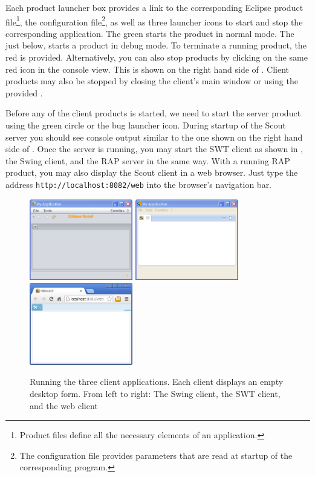 \documentclass[a4paper,10pt,twoside]{book}
\begin{document}
Each product launcher box provides a link to the corresponding Eclipse product file\footnote{
Product files define all the necessary elements of an application.
},
the configuration file\footnote{
The configuration file  provides parameters that are read at startup of the corresponding program.
},
as well as three launcher icons to start and stop the corresponding application.
The green  starts the product in normal mode.
The  just below, starts a product in debug mode.
To terminate a running product, the red  is provided. 
Alternatively, you can also stop products by clicking on the same red icon in the console view.
This is shown on the right hand side of .
Client products may also be stopped by closing the client's main window or using the provided .

Before any of the client products is started, we need to start the server product using the green circle or the bug launcher icon.
During startup of the Scout server you should see console output similar to the one shown on the right hand side of .
Once the server is running, you may start the SWT client as shown in , the Swing client, and the RAP server in the same way.
With a running RAP product, you may also display the Scout client in a web browser.
Just type the address \texttt{http://localhost:8082/web} into the browser's navigation bar.

\begin{figure}
\includegraphics[width=4.5cm]{hellworld_empty_swing.png} \hspace{3mm}
\includegraphics[width=4.5cm]{hellworld_empty_swt.png} \hspace{3mm}
\includegraphics[width=4.5cm]{hellworld_empty_rap.png}
\caption{Running the three client applications. 
Each client displays an empty desktop form. 
From left to right: The Swing client, the SWT client, and the web client}
\end{figure}
\end{document}
